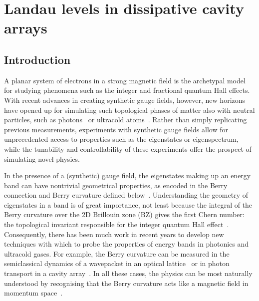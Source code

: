 

\chapter{Landau levels in dissipative cavity arrays}
\label{cha:landau}

\section{Introduction}

A planar system of electrons in a strong magnetic field is the
archetypal model for studying phenomena such as the integer and
fractional quantum Hall effects. With recent advances in creating
synthetic gauge fields, however, new horizons have opened up for
simulating such topological phases of matter also with neutral
particles, such as photons~\cite{hafezi2014synthetic} or ultracold
atoms~\cite{dalibardrmp2011, goldman_repprog_2014,
Goldman_arxiv_2015}.  Rather than simply replicating previous
measurements, experiments with synthetic gauge fields allow for
unprecedented access to properties such as the eigenstates or
eigenspectrum, while the tunability and controllability of these
experiments offer the prospect of simulating novel physics.

In the presence of a (synthetic) gauge field, the eigenstates making
up an energy band can have nontrivial geometrical properties, as
encoded in the Berry connection and Berry curvature defined
below~\cite{berry, xiao2010berryreview}. Understanding the geometry of
eigenstates in a band is of great importance, not least because the
integral of the Berry curvature over the 2D Brillouin zone (BZ) gives
the first Chern number: the topological invariant responsible for the
integer quantum Hall effect~\cite{thouless}. Consequently, there has
been much work in recent years to develop new techniques with which to
probe the properties of energy bands in photonics and ultracold
gases. For example, the Berry curvature can be measured in the
semiclassical dynamics of a wavepacket in an optical
lattice~\cite{dudarev,1chang, price, cominotti, dauphin,
aidelsburger2015measuring, jotzu2014experimental} or in photon
transport in a cavity array~\cite{ozawa2014qhe}. In all these cases,
the physics can be most naturally understood by recognising that the
Berry curvature acts like a magnetic field in momentum
space~\cite{berry, bliokh2005spin, PhysRevD.12.3845,
cooper2012designing}.

